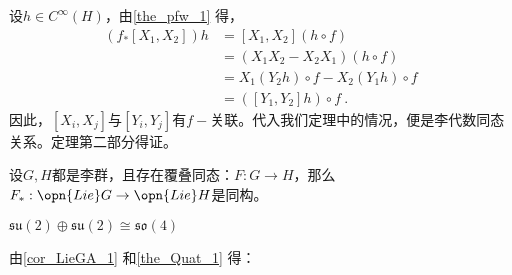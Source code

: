 设$h\in C^{\infty} (H)$，由\autoref{the_pfw_1} 得，
\begin{equation}
\begin{aligned}
(f_*[X_1,X_2])h&=[X_1,X_2](h\circ f)\\
&=(X_1X_2-X_2X_1)(h\circ f)\\
&=X_1(Y_2h)\circ f-X_2(Y_1h)\circ f\\
&=([Y_1,Y_2]h)\circ f~.
\end{aligned}
\end{equation}
因此，$[X_i,X_j]$与$[Y_i,Y_j]$有$f-$关联。代入我们定理中的情况，便是李代数同态关系。定理第二部分得证。
\begin{corollary}{}\label{cor_LieGA_1}
设$G,H$都是李群，且存在覆叠同态：$F:G\to H$，那么$F_*:\opn{Lie}G\to \opn{Lie}H$是同构。
\end{corollary}
\begin{example}{}
$\mathfrak {su}(2)\oplus \mathfrak {su}(2)\cong \mathfrak{so}(4)$
\end{example}
由\autoref{cor_LieGA_1} 和\autoref{the_Quat_1} 得：


















